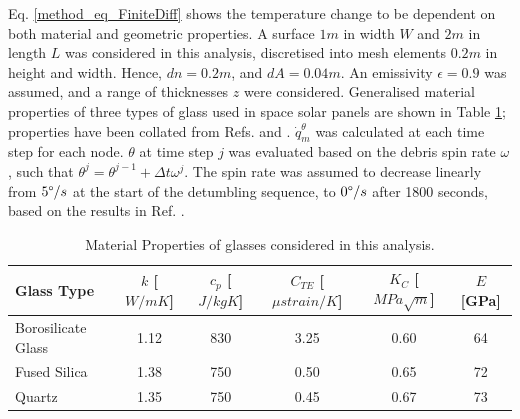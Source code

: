 \documentclass[journal]{new-aiaa}
\begin{document}
 Eq. \ref{method_eq_FiniteDiff} shows the temperature change to be dependent on both material and geometric properties. A surface $1m$ in width $W$ and $2m$ in length $L$ was considered in this analysis, discretised into mesh elements $0.2m$ in height and width. Hence, $dn=0.2m$, and $dA = 0.04m$. An emissivity $\epsilon = 0.9$ was assumed, and a range of thicknesses $z$ were considered. Generalised material properties of three types of glass used in space solar panels are shown in Table \ref{method_tab_GlassMatProps}; properties have been collated from Refs. \cite{gilmoreSpacecraftThermalControl2002} and \cite{ansysAnsysGrantaEduPack2024}. $\dot{q}_m^{\theta}$ was calculated at each time step for each node. $\theta$ at time step $j$ was evaluated based on the debris spin rate $\omega$, such that $\theta^j = \theta^{j-1} + \Delta t \omega^j$. The spin rate was assumed to decrease linearly from $5\degree /s$ at the start of the detumbling sequence, to $0 \degree /s$ after 1800 seconds, based on the results in Ref. \cite{petersCOBRAContactlessDetumbling2016}.

\begin{table}[H]
    \centering
    \caption{Material Properties of glasses considered in this analysis.}
    \begin{tabular}[\columnwidth]{lccccc}
        \hline
        \hline
        Glass Type & $k$ [$W/mK$] & $c_p$ [$J/kgK$] & $C_{TE}$ [$\mu strain/K$]& $K_C$ [$MPa \sqrt{m}$] & $E$ [GPa] \\
        \hline
        Borosilicate Glass & 1.12 & 830 & 3.25 & 0.60 & 64 \\
        Fused Silica & 1.38 & 750 & 0.50 & 0.65 & 72\\
        Quartz & 1.35 & 750 & 0.45 & 0.67 & 73 \\ 
        \hline\hline
    \end{tabular}
    \label{method_tab_GlassMatProps}
\end{table}







\end{document}

